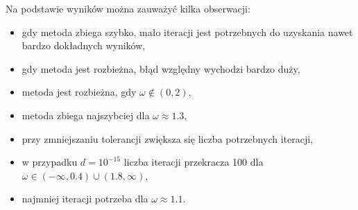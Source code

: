 \documentclass[12pt]{article}
\begin{document}
Na podstawie wyników można zauważyć kilka obserwacji:
\begin{itemize}
    \item gdy metoda zbiega szybko, mało iteracji jest potrzebnych do uzyskania nawet bardzo dokładnych wyników,
    \item gdy metoda jest rozbieżna, błąd względny wychodzi bardzo duży,
    \item metoda jest rozbieżna, gdy $\omega \notin (0,2)$,
    \item metoda zbiega najszybciej dla $\omega \approx 1.3$,
    \item przy zmniejszaniu tolerancji zwiększa się liczba potrzebnych iteracji,
    \item w przypadku $d = 10^{-15}$ liczba iteracji przekracza 100 dla $\omega \in (-\infty,0.4)\cup(1.8,\infty)$,
    \item najmniej iteracji potrzeba dla $\omega \approx 1.1$.
\end{itemize}
\end{document}
